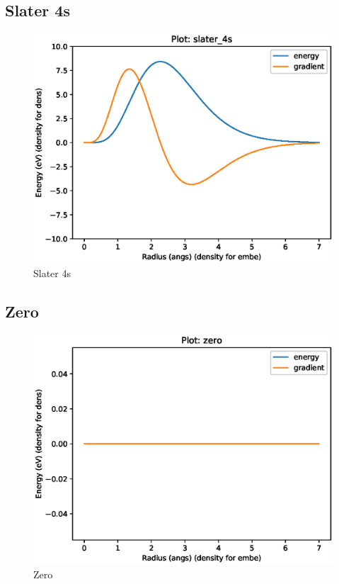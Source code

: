 
\FloatBarrier
\subsection{Slater 4s}





\FloatBarrier
\begin{figure}[h]
  \begin{center}
    \includegraphics[width=0.7\linewidth]{appendix/functions/pots_plots/slater_4s.eps}
    \caption{Slater 4s}
    \label{figure:functionsslater4s}
  \end{center}
\end{figure}




\subsection{Zero}





\FloatBarrier
\begin{figure}[h]
  \begin{center}
    \includegraphics[width=0.7\linewidth]{appendix/functions/pots_plots/zero.eps}
    \caption{Zero}
    \label{figure:functionszero}
  \end{center}
\end{figure}


